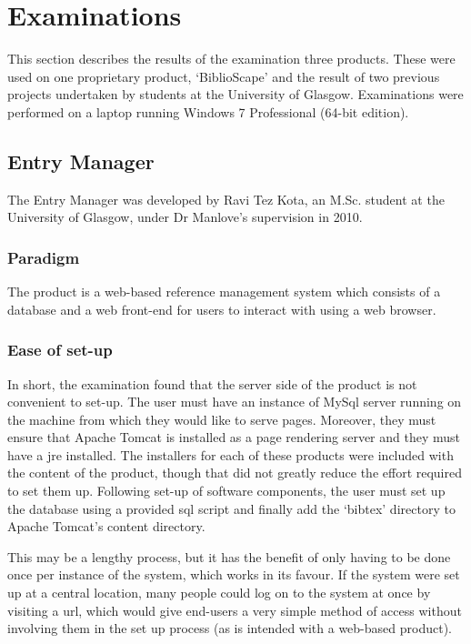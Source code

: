 \section{Examinations}
This section describes the results of the examination three products.  These were used on one proprietary product, `BiblioScape' and the result of two previous projects undertaken by students at the University of Glasgow.  Examinations were performed on a laptop running Windows 7 Professional (64-bit edition).

\subsection{\bibtex{} Entry Manager}
The \bibtex{} Entry Manager was developed by Ravi Tez Kota, an M.Sc. student at the University of Glasgow, under Dr Manlove's supervision in 2010.

\subsubsection{Paradigm}
The product is a web-based reference management system which consists of a database and a web front-end for users to interact with using a web browser.

\subsubsection{Ease of set-up}
In short, the examination found that the server side of the product is not convenient to set-up.  The user must have an instance of MySql server running on the machine from which they would like to serve pages. Moreover, they must ensure that Apache Tomcat is installed as a page rendering server and they must have a \gls{jre} installed.  The installers for each of these products were included with the content of the product, though that did not greatly reduce the effort required to set them up.  Following set-up of software components, the user must set up the database using a provided \gls{sql} script and finally add the `bibtex' directory to Apache Tomcat's content directory.  

This may be a lengthy process, but it has the benefit of only having to be done once per instance of the system, which works in its favour. If the system were set up at a central location, many people could log on to the system at once by visiting a \gls{url}, which would give end-users a very simple method of access without involving them in the set up process (as is intended with a web-based product).

